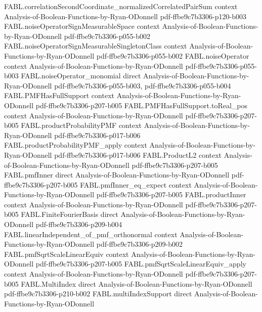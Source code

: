 \begin{theorem}
  {FABL.correlationSecondCoordinate_normalizedCorrelatedPairSum}
  {context}
  {Analysis-of-Boolean-Functions-by-Ryan-ODonnell}
  {pdf-ffbe9c7b3306-p120-b003}
\proofstep
  {FABL.noiseOperatorSignMeasurableSpace}
  {context}
  {Analysis-of-Boolean-Functions-by-Ryan-ODonnell}
  {pdf-ffbe9c7b3306-p055-b002}
\proofstep
  {FABL.noiseOperatorSignMeasurableSingletonClass}
  {context}
  {Analysis-of-Boolean-Functions-by-Ryan-ODonnell}
  {pdf-ffbe9c7b3306-p055-b002}
\proofstep
  {FABL.noiseOperator}
  {context}
  {Analysis-of-Boolean-Functions-by-Ryan-ODonnell}
  {pdf-ffbe9c7b3306-p055-b003}
\proofstep
  {FABL.noiseOperator_monomial}
  {direct}
  {Analysis-of-Boolean-Functions-by-Ryan-ODonnell}
  {pdf-ffbe9c7b3306-p055-b003,
    pdf-ffbe9c7b3306-p055-b004}
\proofstep
  {FABL.PMFHasFullSupport}
  {context}
  {Analysis-of-Boolean-Functions-by-Ryan-ODonnell}
  {pdf-ffbe9c7b3306-p207-b005}
\proofstep
  {FABL.PMFHasFullSupport.toReal_pos}
  {context}
  {Analysis-of-Boolean-Functions-by-Ryan-ODonnell}
  {pdf-ffbe9c7b3306-p207-b005}
\proofstep
  {FABL.productProbabilityPMF}
  {context}
  {Analysis-of-Boolean-Functions-by-Ryan-ODonnell}
  {pdf-ffbe9c7b3306-p017-b006}
\proofstep
  {FABL.productProbabilityPMF_apply}
  {context}
  {Analysis-of-Boolean-Functions-by-Ryan-ODonnell}
  {pdf-ffbe9c7b3306-p017-b006}
\proofstep
  {FABL.ProductL2}
  {context}
  {Analysis-of-Boolean-Functions-by-Ryan-ODonnell}
  {pdf-ffbe9c7b3306-p207-b005}
\proofstep
  {FABL.pmfInner}
  {direct}
  {Analysis-of-Boolean-Functions-by-Ryan-ODonnell}
  {pdf-ffbe9c7b3306-p207-b005}
\proofstep
  {FABL.pmfInner_eq_expect}
  {context}
  {Analysis-of-Boolean-Functions-by-Ryan-ODonnell}
  {pdf-ffbe9c7b3306-p207-b005}
\proofstep
  {FABL.productInner}
  {context}
  {Analysis-of-Boolean-Functions-by-Ryan-ODonnell}
  {pdf-ffbe9c7b3306-p207-b005}
\proofstep
  {FABL.FiniteFourierBasis}
  {direct}
  {Analysis-of-Boolean-Functions-by-Ryan-ODonnell}
  {pdf-ffbe9c7b3306-p209-b004}
\proofstep
  {FABL.linearIndependent_of_pmf_orthonormal}
  {context}
  {Analysis-of-Boolean-Functions-by-Ryan-ODonnell}
  {pdf-ffbe9c7b3306-p209-b002}
\proofstep
  {FABL.pmfSqrtScaleLinearEquiv}
  {context}
  {Analysis-of-Boolean-Functions-by-Ryan-ODonnell}
  {pdf-ffbe9c7b3306-p207-b005}
\proofstep
  {FABL.pmfSqrtScaleLinearEquiv_apply}
  {context}
  {Analysis-of-Boolean-Functions-by-Ryan-ODonnell}
  {pdf-ffbe9c7b3306-p207-b005}
\proofstep
  {FABL.MultiIndex}
  {direct}
  {Analysis-of-Boolean-Functions-by-Ryan-ODonnell}
  {pdf-ffbe9c7b3306-p210-b002}
\proofstep
  {FABL.multiIndexSupport}
  {direct}
  {Analysis-of-Boolean-Functions-by-Ryan-ODonnell}

\end{theorem}
